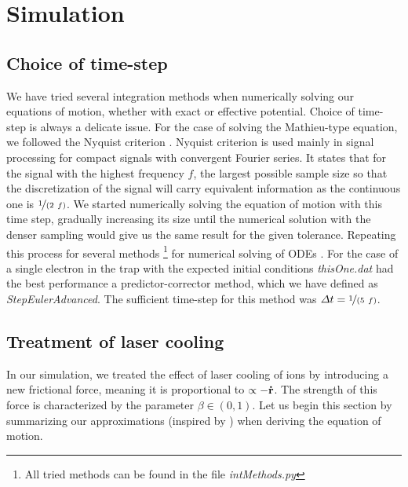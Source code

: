 \section{Simulation}
\label{sec:simulation}

\subsection{Choice of time-step}

We have tried several integration methods when numerically solving our equations of motion, whether with exact or effective potential.
Choice of time-step is always a delicate issue. For the case of solving the Mathieu-type equation, we followed the Nyquist criterion . Nyquist criterion is used mainly in signal processing for compact signals with convergent Fourier series. It states that for the signal with the highest frequency $f$, the largest possible sample size so that the discretization of the signal will carry equivalent information as the continuous one is $\nicefrac{1}{(2 \ f)}$. We started numerically solving the equation of motion with this time step, gradually increasing its size until the numerical solution with the denser sampling would give us the same result for the given tolerance. Repeating this process for several methods \footnote{All tried methods can be found in the file \textit{intMethods.py}} for numerical solving of ODEs \cite{teukolsky1992numerical}. For the case of a single electron in the trap with the expected initial conditions \textit{thisOne.dat} had the best performance a predictor-corrector method, which we have defined as \textit{StepEulerAdvanced}. The sufficient time-step for this method was $\Delta t = \nicefrac{1}{(5 \ f)}$. 


\subsection{Treatment of laser cooling}
In our simulation, we treated the effect of laser cooling of ions by introducing a new frictional force, meaning it is proportional to $\propto - \vb{\dot{r}}$. The strength of this force is characterized by the parameter $\beta \in (0,1)$. 
Let us begin this section by summarizing our approximations (inspired by \cite{Friedman_1982}) when deriving the equation of motion. 

